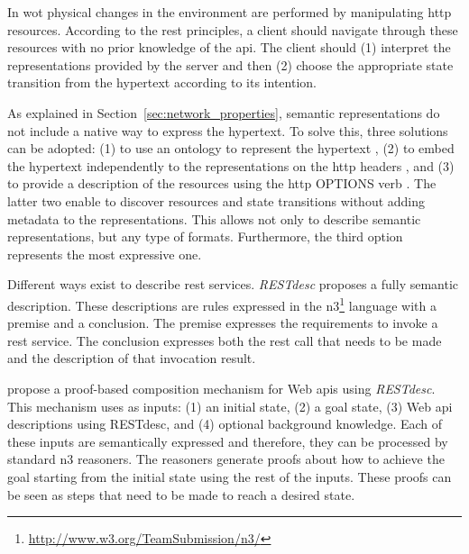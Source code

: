 In \ac{wot} physical changes in the environment are performed by manipulating \ac{http} resources.
According to the \ac{rest} principles, a client should navigate through these resources with no prior knowledge of the \ac{api}.
The client should (1) interpret the representations provided by the server and then (2) choose the appropriate state transition from the hypertext according to its intention. %


As explained in Section~\ref{sec:network_properties}, semantic representations do not include a native way to express the hypertext. %
To solve this, three solutions can be adopted:
(1) to use an ontology to represent the hypertext \citep{kjernsmo_necessity_2012},
(2) to embed the hypertext independently to the representations on the \ac{http} headers \citep{erik_profile_2013}, and
(3) to provide a description of the resources using the \ac{http} OPTIONS verb \citep{verborgh_functional_2012,verborgh_ijcs_2014}.
The latter two enable to discover resources and state transitions without adding metadata to the representations.
This allows not only to describe semantic representations, but any type of formats.
Furthermore, the third option represents the most expressive one. %


Different ways exist to describe \ac{rest} services. %
\emph{RESTdesc} \citep{verborgh_functional_2012} proposes a fully semantic description.
These descriptions are rules expressed in the \ac{n3}\footnote{\url{http://www.w3.org/TeamSubmission/n3/}} language with a premise and a conclusion.
The premise expresses the requirements to invoke a \ac{rest} service.
The conclusion expresses both the \ac{rest} call that needs to be made and the description of that invocation result.


\citet{verborgh_ijcs_2014} propose a proof-based composition mechanism for Web \acp{api} using \emph{RESTdesc}.
This mechanism uses as inputs:
(1) an initial state,
(2) a goal state,
(3) Web \ac{api} descriptions using RESTdesc, and
(4) optional background knowledge.
Each of these inputs are semantically expressed and therefore, they can be processed by standard \ac{n3} reasoners.
The reasoners generate proofs about how to achieve the goal starting from the initial state using the rest of the inputs.
These proofs can be seen as steps that need to be made to reach a desired state.


